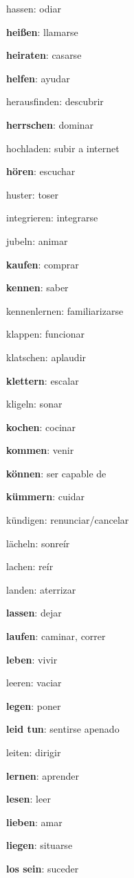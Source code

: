 \begin{multicols}{2}
\begin{myitemize}
\item hassen: odiar
\item \textbf{heißen}: llamarse
\item \textbf{heiraten}: casarse
\item \textbf{helfen}: ayudar
\item herausfinden: descubrir
\item \textbf{herrschen}: dominar
\item hochladen: subir a internet
\item \textbf{hören}: escuchar
\item huster: toser
\item integrieren: integrarse
\item jubeln: animar
\item \textbf{kaufen}: comprar
\item \textbf{kennen}: saber
\item kennenlernen: familiarizarse
\item klappen: funcionar
\item klatschen: aplaudir
\item \textbf{klettern}: escalar
\item kligeln: sonar
\item \textbf{kochen}: cocinar
\item \textbf{kommen}: venir
\item \textbf{können}: ser capable de
\item \textbf{kümmern}: cuidar
\item kündigen: renunciar/cancelar
\item lächeln: sonreír
\item lachen: reír
\item landen: aterrizar
\item \textbf{lassen}: dejar
\item \textbf{laufen}: caminar, correr
\item \textbf{leben}: vivir
\item leeren: vaciar
\item \textbf{legen}: poner
\item \textbf{leid tun}: sentirse apenado
\item leiten: dirigir
\item \textbf{lernen}: aprender
\item \textbf{lesen}: leer
\item \textbf{lieben}: amar
\item \textbf{liegen}: situarse
\item \textbf{los sein}: suceder

\end{myitemize}
\end{multicols}
